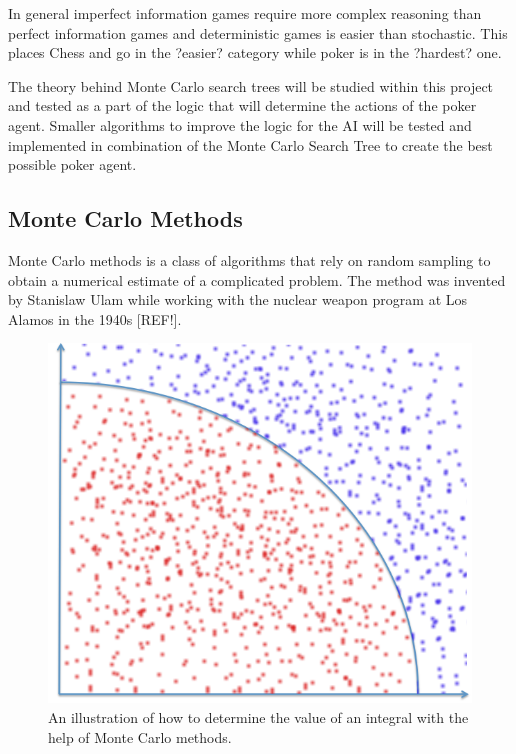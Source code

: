\documentclass[journal]{vgtc}                %
\begin{document}
In general imperfect information games require more complex reasoning than perfect information games and deterministic games is easier than stochastic. This places Chess and go in the ?easier? category while poker is in the ?hardest? one.

The theory behind Monte Carlo search trees will be studied within this project and tested as a part of the logic that will determine the actions of the poker agent. Smaller algorithms to improve the logic for the AI will be tested and implemented in combination of the Monte Carlo Search Tree to create the best possible poker agent.

\subsection{Monte Carlo Methods}
Monte Carlo methods is a class of algorithms that rely on random sampling to obtain a numerical estimate of a complicated problem. The method was invented by Stanislaw Ulam while working with the nuclear weapon program at Los Alamos in the 1940s [REF!]. 
\begin{figure}[here]
  \begin{center}
    \includegraphics[scale=0.35]{img/integralexample.png}
    \caption{\label{fig:integralex} An illustration of how to determine the value of an integral with the help of Monte Carlo methods.}
  \end{center}
\end{figure}
 
\end{document}
